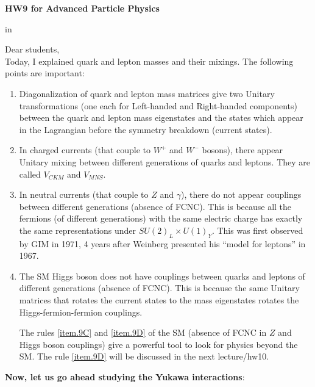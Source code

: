 \documentclass[12pt]{article}
\begin{document}
\begin{center}
{\large\bf HW9 for Advanced Particle Physics} \\

\end{center}

 in

Dear students,\\

Today, I explained quark and lepton masses and their mixings.
The following points are important:

\begin{enumerate}
  \item Diagonalization of quark and lepton mass matrices give two Unitary
  transformations (one each for Left-handed and Right-handed 
components) between the quark and lepton mass eigenstates and the states which
  appear in the Lagrangian before the symmetry breakdown (current 
states).

 \item In charged currents (that couple to $W^+$ and $W^-$ bosons), there
 appear Unitary mixing between different generations of quarks and
 leptons.  They are called $V_{CKM}$ and $V_{MNS}$.

 \item In neutral currents (that couple to $Z$ and $\gamma$), there do not
 appear couplings between different generations (absence of FCNC).
 This is because all the fermions (of different generations) with
 the same electric charge has exactly the same representations under
 $SU(2)_L \times U(1)_Y$.  This was first observed by GIM in 1971, 4 years
 after Weinberg presented his ``model for leptons'' in 1967. \label{item.9C}

 \item The SM Higgs boson does not have couplings between quarks and
 leptons of different generations (absence of FCNC).  This is because
 the same Unitary matrices that rotates the current states to the
 mass eigenstates rotates the Higgs-fermion-fermion couplings. \label{item.9D}

 The rules \ref{item.9C} and \ref{item.9D} of the SM (absence of FCNC in $Z$ and Higgs boson
 couplings) give a powerful tool to look for physics beyond the SM.
 The rule \ref{item.9D} will be discussed in the next lecture/hw10.

\end{enumerate}
  {\bf Now, let us go ahead studying the Yukawa interactions}:
\end{document}
